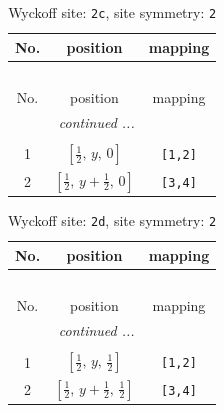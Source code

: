 \documentclass[fleqn,8pt]{jsarticle}
\begin{document}
\begin{longtable}{ccc}
\caption{Wyckoff site: {\tt 2c}, site symmetry: {\tt 2}}
 \\
 \hline \hline
No. & position & mapping \\ \hline \endfirsthead

\multicolumn{2}{l}{\tablename\ \thetable{}} \\
 \hline \hline
No. & position & mapping \\ \hline \endhead

 \hline \hline
\multicolumn{2}{r}{\footnotesize\it continued ...} \\ \endfoot

 \hline \hline
\multicolumn{2}{r}{} \\ \endlastfoot

1 & $\left[ \frac{1}{2},\, y,\, 0 \right]$ & {\tt [1,2]} \\ \hline
2 & $\left[ \frac{1}{2},\, y + \frac{1}{2},\, 0 \right]$ & {\tt [3,4]} \\
\end{longtable}
\renewcommand{\arraystretch}{1.2}
\begin{longtable}{ccc}
\caption{Wyckoff site: {\tt 2d}, site symmetry: {\tt 2}}
 \\
 \hline \hline
No. & position & mapping \\ \hline \endfirsthead

\multicolumn{2}{l}{\tablename\ \thetable{}} \\
 \hline \hline
No. & position & mapping \\ \hline \endhead

 \hline \hline
\multicolumn{2}{r}{\footnotesize\it continued ...} \\ \endfoot

 \hline \hline
\multicolumn{2}{r}{} \\ \endlastfoot

1 & $\left[ \frac{1}{2},\, y,\, \frac{1}{2} \right]$ & {\tt [1,2]} \\ \hline
2 & $\left[ \frac{1}{2},\, y + \frac{1}{2},\, \frac{1}{2} \right]$ & {\tt [3,4]} \\
\end{longtable}
\renewcommand{\arraystretch}{1.2}
\end{document}
